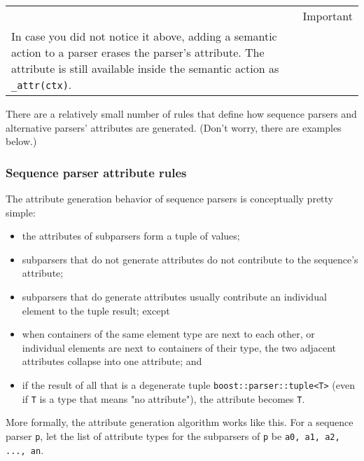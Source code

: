 \begin{longtable}[]{@{}
  >{\raggedright\arraybackslash}p{}
  >{\raggedright\arraybackslash}p{}@{}}
\toprule\noalign{}
\endhead
\bottomrule\noalign{}
\endlastfoot
\begin{minipage}[t]{\linewidth}\raggedright
\end{minipage} & Important \\
In case you did not notice it above, adding a semantic action to a parser erases the parser's attribute. The attribute is still available inside the semantic action as \texttt{\_attr(ctx)}. & \\
\end{longtable}

There are a relatively small number of rules that define how sequence parsers and alternative parsers' attributes are generated. (Don't worry, there are examples below.)

\subsubsection{Sequence parser attribute rules}

The attribute generation behavior of sequence parsers is conceptually pretty simple:

\begin{itemize}
\item
  the attributes of subparsers form a tuple of values;
\item
  subparsers that do not generate attributes do not contribute to the sequence's attribute;
\item
  subparsers that do generate attributes usually contribute an individual element to the tuple result; except
\item
  when containers of the same element type are next to each other, or individual elements are next to containers of their type, the two adjacent attributes collapse into one attribute; and
\item
  if the result of all that is a degenerate tuple \texttt{boost::parser::tuple<T>} (even if \texttt{T} is a type that means "no attribute"), the attribute becomes \texttt{T}.
\end{itemize}

More formally, the attribute generation algorithm works like this. For a sequence parser \texttt{p}, let the list of attribute types for the subparsers of \texttt{p} be \texttt{a0, a1, a2, ..., an}.


